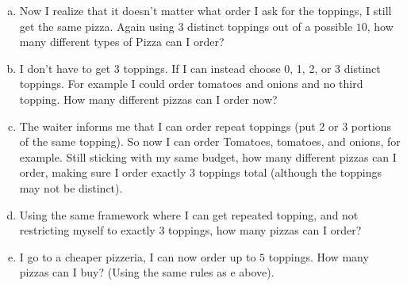 \documentclass[]{article}
\newif\ifsolutions
\newif\ifmotivation
\renewcommand{\answer}[1]{{\color{mydarkblue}\textbf{Solution:}#1}}
\begin{document}
\begin{qunlist}
\begin{enumerate}[a)]
  \qpart
\item Now I realize that it doesn't matter what order I ask for the toppings, I still get the same pizza. Again using $3$ distinct toppings out of a possible $10$, how many different types of Pizza can I order?

\ifsolutions{ \answer { 
$\binom{10}{3}$

}}\fi

  \qpart
\item I don't have to get $3$ toppings. If I can instead choose 0, 1, 2, or 3 distinct toppings. For example I could order tomatoes and onions and no third topping. How many different pizzas can I order now?

\ifsolutions{ \answer { 
$\binom{10}{3} + \binom{10}{2} + \binom{10}{1} + \binom{10}{0}$

}}\fi

  \qpart
\item The waiter informs me that I can order repeat toppings (put 2 or 3 portions of the same topping). So now I can order Tomatoes, tomatoes, and onions, for example. Still sticking with my same budget, how many different pizzas can I order, making sure I order exactly $3$ toppings total (although the toppings may not be distinct).

\ifsolutions{ \answer { 
$\binom{10}{3} + 2*\binom{10}{2} + \binom{10}{1}$

}}\fi

\qpart
\item Using the same framework where I can get repeated topping, and not restricting myself to exactly 3 toppings, how many pizzas can I order?

\ifsolutions{ \answer { 
$\binom{10}{3} + 3*\binom{10}{2} + 3*\binom{10}{1} +binom{10}{0}$

}}\fi

\qpart
\item I go to a cheaper pizzeria, I can now order up to $5$ toppings. How many  pizzas can I buy? (Using the same rules as e above).

\ifsolutions{ \answer { 

$$ \binom{10}{5} +  [1+\binom{4}{1}]\binom{10}{4} +  [1+ 2\binom{3}{1} + \binom{3}{2}] \binom{10}{3} + [1+ 3*\binom{2}{1} + 3*\binom{2}{2}  ]\binom{10}{2} + 5*\binom{10}{1} + \binom{10}{0}$$

}}\fi

\end{enumerate}

\ifmotivation
{\motivation {Motivation - Counting continued but d) is tricky.}}
\fi 



\end{qunlist}
\end{document}
